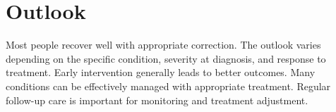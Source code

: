 \section{Outlook}
Most people recover well with appropriate correction. The outlook varies depending on the specific condition, severity at diagnosis, and response to treatment. Early intervention generally leads to better outcomes. Many conditions can be effectively managed with appropriate treatment. Regular follow-up care is important for monitoring and treatment adjustment.
